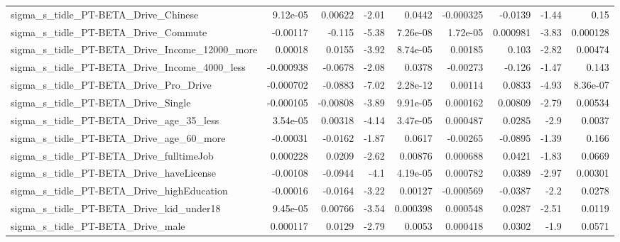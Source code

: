 \begin{tabular}{lrrrrrrrr}
sigma\_s\_tidle\_PT-BETA\_Drive\_Chinese                &    9.12e-05 &      0.00622 &     -2.01 &   0.0442 &  -0.000325 &     -0.0139 &        -1.44 &          0.15 \\
sigma\_s\_tidle\_PT-BETA\_Drive\_Commute                &    -0.00117 &       -0.115 &     -5.38 & 7.26e-08 &   1.72e-05 &    0.000981 &        -3.83 &      0.000128 \\
sigma\_s\_tidle\_PT-BETA\_Drive\_Income\_12000\_more      &     0.00018 &       0.0155 &     -3.92 & 8.74e-05 &    0.00185 &       0.103 &        -2.82 &       0.00474 \\
sigma\_s\_tidle\_PT-BETA\_Drive\_Income\_4000\_less       &   -0.000938 &      -0.0678 &     -2.08 &   0.0378 &   -0.00273 &      -0.126 &        -1.47 &         0.143 \\
sigma\_s\_tidle\_PT-BETA\_Drive\_Pro\_Drive              &   -0.000702 &      -0.0883 &     -7.02 & 2.28e-12 &    0.00114 &      0.0833 &        -4.93 &      8.36e-07 \\
sigma\_s\_tidle\_PT-BETA\_Drive\_Single                 &   -0.000105 &     -0.00808 &     -3.89 & 9.91e-05 &   0.000162 &     0.00809 &        -2.79 &       0.00534 \\
sigma\_s\_tidle\_PT-BETA\_Drive\_age\_35\_less            &    3.54e-05 &      0.00318 &     -4.14 & 3.47e-05 &   0.000487 &      0.0285 &         -2.9 &        0.0037 \\
sigma\_s\_tidle\_PT-BETA\_Drive\_age\_60\_more            &    -0.00031 &      -0.0162 &     -1.87 &   0.0617 &   -0.00265 &     -0.0895 &        -1.39 &         0.166 \\
sigma\_s\_tidle\_PT-BETA\_Drive\_fulltimeJob            &    0.000228 &       0.0209 &     -2.62 &  0.00876 &   0.000688 &      0.0421 &        -1.83 &        0.0669 \\
sigma\_s\_tidle\_PT-BETA\_Drive\_haveLicense            &    -0.00108 &      -0.0944 &      -4.1 & 4.19e-05 &   0.000782 &      0.0389 &        -2.97 &       0.00301 \\
sigma\_s\_tidle\_PT-BETA\_Drive\_highEducation          &    -0.00016 &      -0.0164 &     -3.22 &  0.00127 &  -0.000569 &     -0.0387 &         -2.2 &        0.0278 \\
sigma\_s\_tidle\_PT-BETA\_Drive\_kid\_under18            &    9.45e-05 &      0.00766 &     -3.54 & 0.000398 &   0.000548 &      0.0287 &        -2.51 &        0.0119 \\
sigma\_s\_tidle\_PT-BETA\_Drive\_male                   &    0.000117 &       0.0129 &     -2.79 &   0.0053 &   0.000418 &      0.0302 &         -1.9 &        0.0571 \\

\end{tabular}
